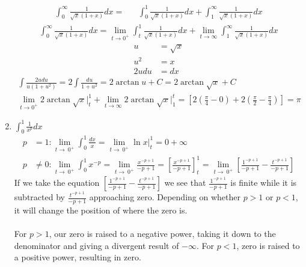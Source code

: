 \documentclass[12pt]{article}
\begin{document}
\begin{enumerate}
    \begin{align*}
        \int_0^\infty\frac{1}{\sqrt{x}(1+x)}dx = && 
        \int_0^1\frac{1}{\sqrt{x}(1+x)}dx + 
        \int_1^\infty\frac{1}{\sqrt{x}(1+x)}dx
    \end{align*}
    \begin{align*}
        \int_0^\infty\frac{1}{\sqrt{x}(1+x)}dx=\lim_{t\to 0^+}\int_t^1\frac{1}{\sqrt{x}(1+x)}dx+
        \lim_{t\to \infty}\int_1^\infty\frac{1}{\sqrt{x}(1+x)}dx
    \end{align*}
    \begin{align*}
        u &= \sqrt{x}
        \\ u^2 &= x
        \\2udu &= dx
    \end{align*}
    \begin{align*}
        \int\frac{2udu}{u(1+u^2)} = 2\int\frac{du}{1+u^2} = 2\arctan u + C = 2\arctan \sqrt{x} + C \\
        \lim_{t\to 0^+} 2\arctan\sqrt{x} \bigg|_t^1 + 
        \lim_{t\to \infty} 2\arctan\sqrt{x} \bigg|_1^t = \left[2\left(\frac{\pi}{4}-0\right) + 2\left(\frac{\pi}{2}-\frac{\pi}{4}\right)\right] = \pi
    \end{align*}
    \newpage\addtocounter{enumi}{1}\item $\int_0^1\frac{1}{x^p}dx$
    \begin{align*}
        p &= 1: \lim_{t\to\ 0^+}\int_0^1\frac{dx}{x} = \lim_{t\to\ 0^+} \ln{x}\bigg|_t^1 = 0 + \infty \\
        p &\neq 0: \lim_{t\to\ 0^+}\int_0^1{x^{-p}} = \lim_{t\to\ 0^+} \frac{x^{-p+1}}{-p+1}=\left[\frac{x^{-p+1}}{-p+1}\right]_t^1=
        \lim_{t\to\ 0^+}\left[\frac{1^{-p+1}}{-p+1}-\frac{t^{-p+1}}{-p+1}\right]
    \end{align*}
    If we take the equation $\left[\frac{1^{-p+1}}{-p+1}-\frac{t^{-p+1}}{-p+1}\right]$ we see that $\frac{1^{-p+1}}{-p+1}$ is finite while it is subtracted by $\frac{t^{-p+1}}{-p+1}$ approaching zero. Depending on whether $p > 1$ or $p < 1$, it will change the position of where the zero is.\\\\ For $p > 1$, our zero is raised to a negative power, taking it down to the denominator and giving a divergent result of $-\infty$.
    For $p < 1$, zero is raised to a positive power, resulting in zero.
\end{enumerate}
\end{document}
